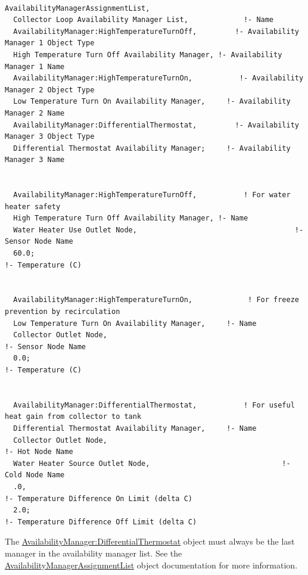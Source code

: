 \begin{lstlisting}

AvailabilityManagerAssignmentList,
  Collector Loop Availability Manager List,             !- Name
  AvailabilityManager:HighTemperatureTurnOff,         !- Availability Manager 1 Object Type
  High Temperature Turn Off Availability Manager, !- Availability Manager 1 Name
  AvailabilityManager:HighTemperatureTurnOn,           !- Availability Manager 2 Object Type
  Low Temperature Turn On Availability Manager,     !- Availability Manager 2 Name
  AvailabilityManager:DifferentialThermostat,         !- Availability Manager 3 Object Type
  Differential Thermostat Availability Manager;     !- Availability Manager 3 Name


  AvailabilityManager:HighTemperatureTurnOff,           ! For water heater safety
  High Temperature Turn Off Availability Manager, !- Name
  Water Heater Use Outlet Node,                                     !- Sensor Node Name
  60.0;                                                                                     !- Temperature (C)


  AvailabilityManager:HighTemperatureTurnOn,             ! For freeze prevention by recirculation
  Low Temperature Turn On Availability Manager,     !- Name
  Collector Outlet Node,                                                   !- Sensor Node Name
  0.0;                                                                                       !- Temperature (C)


  AvailabilityManager:DifferentialThermostat,           ! For useful heat gain from collector to tank
  Differential Thermostat Availability Manager,     !- Name
  Collector Outlet Node,                                                   !- Hot Node Name
  Water Heater Source Outlet Node,                               !- Cold Node Name
  .0,                                                                                     !- Temperature Difference On Limit (delta C)
  2.0;                                                                                       !- Temperature Difference Off Limit (delta C)
\end{lstlisting}

The \hyperref[availabilitymanagerdifferentialthermostat]{AvailabilityManager:DifferentialThermostat} object must always be the last manager in the availability manager list. See the \hyperref[availabilitymanagerassignmentlist]{AvailabilityManagerAssignmentList} object documentation for more information.

